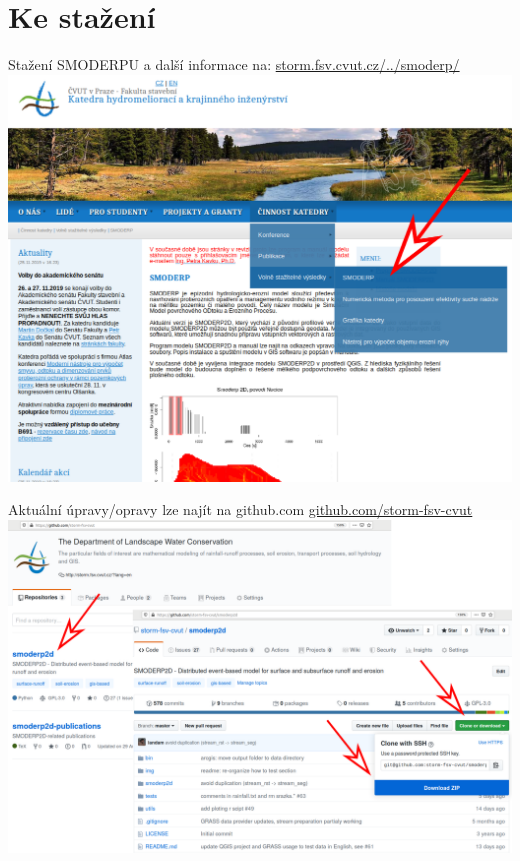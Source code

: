 \section{Ke stažení}
\begin{frame}
    Stažení SMODERPU a další informace na: \href{http://storm.fsv.cvut.cz/cinnost-katedry/volne-stazitelne-vysledky/smoderp/?lang=cz}{storm.fsv.cvut.cz/../smoderp/}\vspace{1em}
    \includegraphics[height=0.9\textheight]{obr/storm-web.png}
\end{frame}
\begin{frame}
    Aktuální úpravy/opravy lze najít na github.com \href{https://github.com/storm-fsv-cvut/smoderp2d}{github.com/storm-fsv-cvut}\vspace{1em}
    \includegraphics[width=\textwidth]{obr/git.png}
\end{frame}

